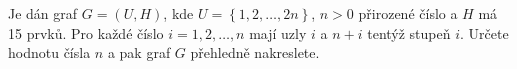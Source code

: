 \subsubsection{}
Je dán graf $G=(U,H)$, kde $U=\left \{ 1,2, \dots,2n \right \}$, $n>0$ přirozené
číslo a $H$ má 15 prvků. Pro každé číslo $i=1,2, \dots,n$ mají uzly $i$ a $n+i$
tentýž stupeň $i$. Určete hodnotu čísla $n$ a pak graf $G$ přehledně nakreslete.
